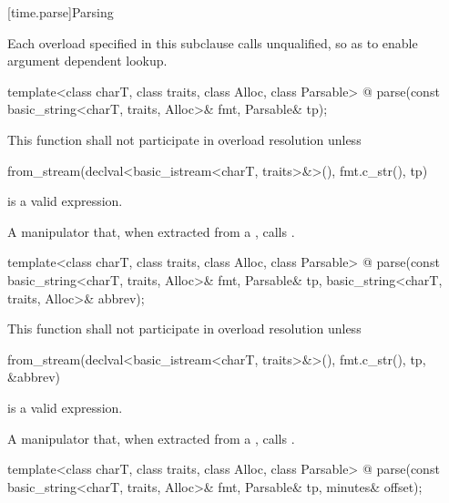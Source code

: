 %

[time.parse]{Parsing}

%

\pnum
Each  overload specified in this subclause
calls  unqualified,
so as to enable argument dependent lookup.

\begin{itemdecl}
template<class charT, class traits, class Alloc, class Parsable>
  @\unspec@
    parse(const basic_string<charT, traits, Alloc>& fmt, Parsable& tp);
\end{itemdecl}

\begin{itemdescr}
\pnum
\remarks
This function shall not participate in overload resolution unless
\begin{codeblock}
from_stream(declval<basic_istream<charT, traits>&>(), fmt.c_str(), tp)
\end{codeblock}
is a valid expression.

\pnum
\returns
A manipulator that, when extracted from a
 ,
calls .
\end{itemdescr}

\begin{itemdecl}
template<class charT, class traits, class Alloc, class Parsable>
  @\unspec@
    parse(const basic_string<charT, traits, Alloc>& fmt, Parsable& tp,
          basic_string<charT, traits, Alloc>& abbrev);
\end{itemdecl}

\begin{itemdescr}
\pnum
\remarks
This function shall not participate in overload resolution unless
\begin{codeblock}
from_stream(declval<basic_istream<charT, traits>&>(), fmt.c_str(), tp, &abbrev)
\end{codeblock}
is a valid expression.

\pnum
\returns
A manipulator that, when extracted from a
 ,
calls .
\end{itemdescr}

\begin{itemdecl}
template<class charT, class traits, class Alloc, class Parsable>
  @\unspec@
    parse(const basic_string<charT, traits, Alloc>& fmt, Parsable& tp,
          minutes& offset);
\end{itemdecl}

